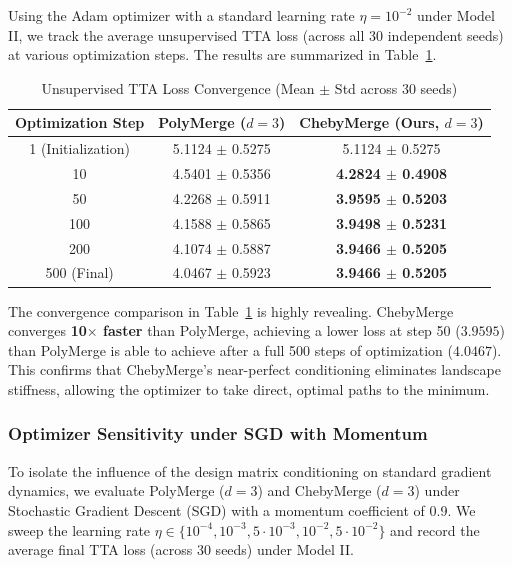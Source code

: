 \documentclass{article}
\theoremstyle{plain}
\theoremstyle{definition}
\theoremstyle{remark}
\begin{document}
Using the Adam optimizer with a standard learning rate $\eta = 10^{-2}$ under Model II, we track the average unsupervised TTA loss (across all 30 independent seeds) at various optimization steps. The results are summarized in Table~\ref{tab:convergence_speed}.

\begin{table}[h]
\caption{Unsupervised TTA Loss Convergence (Mean $\pm$ Std across 30 seeds)}
\label{tab:convergence_speed}
\vskip 0.15in
\begin{center}
\begin{small}
\begin{tabular}{ccc}
\toprule
Optimization Step & PolyMerge ($d=3$) & ChebyMerge (Ours, $d=3$) \\
\midrule
1 (Initialization) & 5.1124 $\pm$ 0.5275 & 5.1124 $\pm$ 0.5275 \\
10 & 4.5401 $\pm$ 0.5356 & \textbf{4.2824 $\pm$ 0.4908} \\
50 & 4.2268 $\pm$ 0.5911 & \textbf{3.9595 $\pm$ 0.5203} \\
100 & 4.1588 $\pm$ 0.5865 & \textbf{3.9498 $\pm$ 0.5231} \\
200 & 4.1074 $\pm$ 0.5887 & \textbf{3.9466 $\pm$ 0.5205} \\
500 (Final) & 4.0467 $\pm$ 0.5923 & \textbf{3.9466 $\pm$ 0.5205} \\
\bottomrule
\end{tabular}
\end{small}
\end{center}
\vskip -0.1in
\end{table}

The convergence comparison in Table~\ref{tab:convergence_speed} is highly revealing. ChebyMerge converges \textbf{10$\times$ faster} than PolyMerge, achieving a lower loss at step 50 ($3.9595$) than PolyMerge is able to achieve after a full 500 steps of optimization ($4.0467$). This confirms that ChebyMerge's near-perfect conditioning eliminates landscape stiffness, allowing the optimizer to take direct, optimal paths to the minimum.

\subsubsection{Optimizer Sensitivity under SGD with Momentum}
To isolate the influence of the design matrix conditioning on standard gradient dynamics, we evaluate PolyMerge ($d=3$) and ChebyMerge ($d=3$) under Stochastic Gradient Descent (SGD) with a momentum coefficient of 0.9. We sweep the learning rate $\eta \in \{10^{-4}, 10^{-3}, 5\cdot 10^{-3}, 10^{-2}, 5\cdot 10^{-2}\}$ and record the average final TTA loss (across 30 seeds) under Model II.
\end{document}

